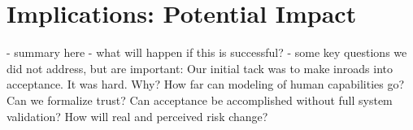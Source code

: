 
\section*{Implications: Potential Impact}

- summary here
- what will happen if this is successful?
- some key questions we did not address, but are important:
Our initial tack was to make inroads into acceptance.  It was hard.  Why?
How far can modeling of human capabilities go? 
Can we formalize trust?
Can acceptance be accomplished without full system validation?
How will real and perceived risk change?

